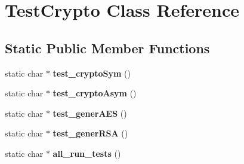 \hypertarget{class_test_crypto}{\section{Test\-Crypto Class Reference}
\label{class_test_crypto}
}
\subsection*{Static Public Member Functions}
\begin{DoxyCompactItemize}
\item 
\hypertarget{class_test_crypto_a43e7360652d8106f336d3a86326ff725}{static char $\ast$ {\bfseries test\-\_\-crypto\-Sym} ()}\label{class_test_crypto_a43e7360652d8106f336d3a86326ff725}

\item 
\hypertarget{class_test_crypto_a2157888faa329df5140ba613145520e1}{static char $\ast$ {\bfseries test\-\_\-crypto\-Asym} ()}\label{class_test_crypto_a2157888faa329df5140ba613145520e1}

\item 
\hypertarget{class_test_crypto_a9cf33dd411c19e96ec9e69435266e8ac}{static char $\ast$ {\bfseries test\-\_\-gener\-A\-E\-S} ()}\label{class_test_crypto_a9cf33dd411c19e96ec9e69435266e8ac}

\item 
\hypertarget{class_test_crypto_a23752ba4d21621045aa119531c9496c3}{static char $\ast$ {\bfseries test\-\_\-gener\-R\-S\-A} ()}\label{class_test_crypto_a23752ba4d21621045aa119531c9496c3}

\item 
\hypertarget{class_test_crypto_a09758f933b284ded8ea4c3d08ffb98e6}{static char $\ast$ {\bfseries all\-\_\-run\-\_\-tests} ()}\label{class_test_crypto_a09758f933b284ded8ea4c3d08ffb98e6}

\end{DoxyCompactItemize}
